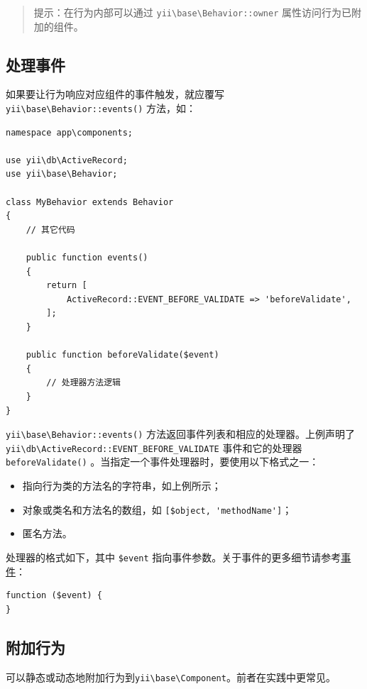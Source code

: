 \begin{quote}提示：在行为内部可以通过 \texttt{yii{\allowbreak{}\textbackslash}base{\allowbreak{}\textbackslash}Behavior\allowbreak{}::\allowbreak{}owner} 属性访问行为已附加的组件。

\end{quote}
\subsection{处理事件}
如果要让行为响应对应组件的事件触发，就应覆写 \texttt{yii{\allowbreak{}\textbackslash}base{\allowbreak{}\textbackslash}Behavior\allowbreak{}::\allowbreak{}events()} 方法，如：

\lstset{language=php}\begin{lstlisting}
namespace app\components;

use yii\db\ActiveRecord;
use yii\base\Behavior;

class MyBehavior extends Behavior
{
    // 其它代码

    public function events()
    {
        return [
            ActiveRecord::EVENT_BEFORE_VALIDATE => 'beforeValidate',
        ];
    }

    public function beforeValidate($event)
    {
        // 处理器方法逻辑
    }
}
\end{lstlisting}
\texttt{yii{\allowbreak{}\textbackslash}base{\allowbreak{}\textbackslash}Behavior\allowbreak{}::\allowbreak{}events()} 方法返回事件列表和相应的处理器。上例声明了 \texttt{yii{\allowbreak{}\textbackslash}db{\allowbreak{}\textbackslash}ActiveRecord\allowbreak{}::\allowbreak{}EVENT\_BEFORE\_VALIDATE} 事件和它的处理器 \lstinline|beforeValidate()| 。当指定一个事件处理器时，要使用以下格式之一：

\begin{itemize}
\item 指向行为类的方法名的字符串，如上例所示；
\item 对象或类名和方法名的数组，如 \lstinline|[$object, 'methodName']|；
\item 匿名方法。
\end{itemize}
处理器的格式如下，其中 \lstinline|$event| 指向事件参数。关于事件的更多细节请参考\hyperref[basic-events.md]{事件}：

\lstset{language=php}\begin{lstlisting}
function ($event) {
}
\end{lstlisting}
\subsection{附加行为}
可以静态或动态地附加行为到\texttt{yii{\allowbreak{}\textbackslash}base{\allowbreak{}\textbackslash}Component}。前者在实践中更常见。

